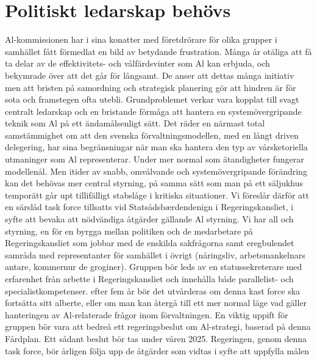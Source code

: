{\section*{Politiskt ledarskap behövs}
Al-kommissionen har i sina konatter med företdrörare för olika grupper i samhället fått förmedlat en bild av betydande frustration. Många år otäliga att få ta delar av de effektivitets- och vålfärdsvinter som Al kan erbjuda, och bekymrade över att det går för långsamt. De anser att dettas många initiativ men att bristen på samordning och strategisk planering gör att hindren är för sota och framstegen ofta utebli.
Grundproblemet verkar vara kopplat till svagt centralt ledarskap och en bristande förmåga att hantera en
systemövergripande teknik som Al på ett ändamålsenligt sätt. Det räder en närmast total samstämmighet om att den svenska förvaltningsmodellen, med en långt driven delegering, har sina begränsningar när man ska hantera den typ av vårsketoriella utmaninger som Al representerar. Under mer normal som ätandigheter fungerar modellenål. Men itider av snabb, omvålvande och systemövergripande förändring kan det behövas mer central styrning, på samma sätt som man på ett säljukhus temporätt går upt tillifälligt stabslåge i kritiska situationer.
Vi föreslår därför att en särslåd task force tillsatts vid Statsådsbærdendenign i Regeringskansliet, i syfte att bevaka att nödvändiga åtgärder gällande Al styrning. Vi har all och styrning, en för en byrgga mellan politiken och de medarbetare på Regeringskansliet som jobbar med de enskilda sakfrågorna samt eregbulendet samråda med representanter för samhället i övrigt (nåringsliv, arbetsmankelnars antare, kommernur de groginer). Gruppen bör leds av en statussekreterare med erfarenhet från arbette i Regeringskansliet och innehålla både parallelist- och specialistkompetenser. efter fem år bör det utvårderas om denna kast force ska fortsätta sitt alberte, eller om man kan återgå till ett mer normal läge vad gäller hanteringen av Al-relaterade frågor inom förvaltningen.
En viktig uppift för gruppen bör vara att bedreå ett regeringsbeslut om Al-strategi, baserad på denna Fårdplan. Ett sådant beslut bör tas under våren 2025. Regeringen, genom denna task force, bör årligen följa upp de åtgärder som vidtas i syfte att uppfylla målen

}
